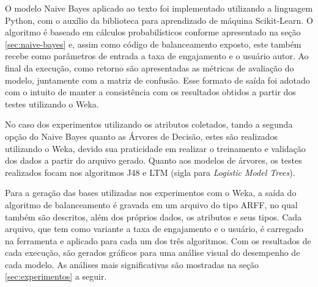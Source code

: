 \documentclass[oneside,openright,12pt]{ufsm_2015} %
\begin{document}
    \par O modelo Naive Bayes aplicado ao texto foi implementado utilizando a linguagem Python, com o auxílio da biblioteca para aprendizado de máquina Scikit-Learn. O algoritmo é baseado em cálculos probabilísticos conforme apresentado na seção \ref{sec:naive-bayes} e, assim como código de balanceamento exposto, este também recebe como parâmetros de entrada a taxa de engajamento e o usuário autor. Ao final da execução, como retorno são apresentadas as métricas de avaliação do modelo, juntamente com a matriz de confusão. Esse formato de saída foi adotado com o intuito de manter a consistência com os resultados obtidos a partir dos testes utilizando o Weka.
    
    \par No caso dos experimentos utilizando os atributos coletados, tando a segunda opção do Naive Bayes quanto as Árvores de Decisão, estes são realizados utilizando o Weka, devido sua praticidade em realizar o treinamento e validação dos dados a partir do arquivo gerado. Quanto aos modelos de árvores, os testes realizados focam nos algoritmos J48 e LTM (sigla para \textit{Logistic Model Trees}).
    
    \par Para a geração das bases utilizadas nos experimentos com o Weka, a saída do algoritmo de balanceamento é gravada em um arquivo do tipo ARFF, no qual também são descritos, além dos próprios dados, os atributos e seus tipos. Cada arquivo, que tem como variante a taxa de engajamento e o usuário, é carregado na ferramenta e aplicado para cada um dos três algoritmos. Com os resultados de cada execução, são gerados gráficos para uma análise visual do desempenho de cada modelo. As análises mais significativas são mostradas na seção \ref{sec:experimentos} a seguir.


\end{document}
